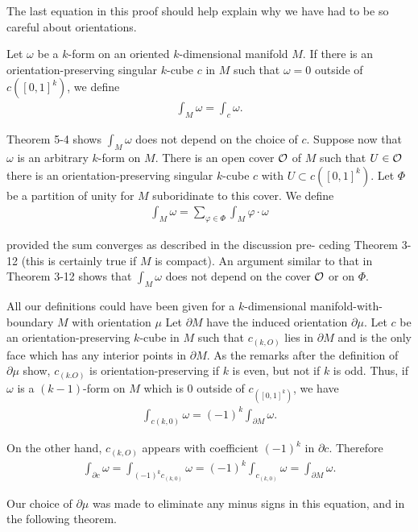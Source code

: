 The last equation in this proof should help explain why we
have had to be so careful about orientations.

Let $\omega$ be a $k$-form on an oriented $k$-dimensional manifold $M$.
If there is an orientation-preserving singular $k$-cube $c$ in $M$ such
that $\omega=0$ outside of $c([0, 1]^k)$, we define
\begin{align*}
    \int_M\omega=\int_c\omega.
\end{align*}

Theorem 5-4 shows $\int_M \omega$ does not depend on the choice of $c$. Suppose 
now that $\omega$ is an arbitrary $k$-form on $M$. There is an open cover $\mathcal{O}$
of $M$ such that $U\in \mathcal{O}$ there is an orientation-preserving singular $k$-cube 
$c$ with $U\subset c([0,1]^k)$. Let $\Phi$ be a partition of unity for $M$ suboridinate 
to this cover. We define 
\begin{align*}
    \int_M\omega=\sum_{\varphi\in\Phi}\int_M\varphi\cdot\omega 
\end{align*} 

provided the sum converges as described in the discussion pre-
ceding Theorem 3-12 (this is certainly true if $M$ is compact).
An argument similar to that in Theorem 3-12 shows that $\int_M \omega$
does not depend on the cover $\mathcal{O}$ or on $\Phi$.

All our definitions could have been given for a $k$-dimensional manifold-with-boundary $M$ 
with orientation $\mu$ Let $\partial M$ have the induced orientation $\partial\mu$.
Let $c$ be an orientation-preserving $k$-cube in $M$ such that $c_{(k,O)}$ lies in $\partial M$ and 
is the only face which has any interior points in $\partial M$. As the remarks after
the definition of $\partial\mu$ show, $c_{(k.O)}$ is orientation-preserving if $k$ is
even, but not if $k$ is odd. Thus, if $\omega$ is a $(k-1)$-form on $M$ which is 0 outside 
of $c_{([0,1]^k)}$, we have
\begin{align*}
  \int_{c(k,0)}\omega = (-1)^k\int_{\partial M}\omega. 
\end{align*}

On the other hand, $c_{(k,O)}$ appears with coefficient $(-1)^k$ in $\partial c$.
Therefore
\begin{align*}
    \int_{\partial c}\omega 
    = \int_{(-1)^{k}c_{(k,0)}}\omega
    = (-1)^{k} \int_{c_{(k,0)}}\omega
    = \int_{\partial M}\omega.
\end{align*}

Our choice of $\partial \mu$ was made to eliminate any minus signs in this equation, and 
in the following theorem.

